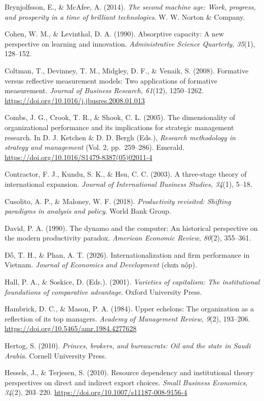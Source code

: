 \documentclass[
  a4paper,
  13pt]{extreport}
\begin{document}
Brynjolfsson, E., \& McAfee, A. (2014). \emph{The second machine age:
Work, progress, and prosperity in a time of brilliant technologies}. W.
W. Norton \& Company.

Cohen, W. M., \& Levinthal, D. A. (1990). Absorptive capacity: A new
perspective on learning and innovation. \emph{Administrative Science
Quarterly, 35}(1), 128--152.

Coltman, T., Devinney, T. M., Midgley, D. F., \& Venaik, S. (2008).
Formative versus reflective measurement models: Two applications of
formative measurement. \emph{Journal of Business Research, 61}(12),
1250--1262. \url{https://doi.org/10.1016/j.jbusres.2008.01.013}

Combs, J. G., Crook, T. R., \& Shook, C. L. (2005). The dimensionality
of organizational performance and its implications for strategic
management research. In D. J. Ketchen \& D. D. Bergh (Eds.),
\emph{Research methodology in strategy and management} (Vol. 2,
pp.~259--286). Emerald.
\url{https://doi.org/10.1016/S1479-8387(05)02011-4}

Contractor, F. J., Kundu, S. K., \& Hsu, C. C. (2003). A three-stage
theory of international expansion. \emph{Journal of International
Business Studies, 34}(1), 5--18.

Cusolito, A. P., \& Maloney, W. F. (2018). \emph{Productivity revisited:
Shifting paradigms in analysis and policy}. World Bank Group.

David, P. A. (1990). The dynamo and the computer: An historical
perspective on the modern productivity paradox. \emph{American Economic
Review, 80}(2), 355--361.

Đỗ, T. H., \& Phan, A. T. (2026). Internationalization and firm
performance in Vietnam. \emph{Journal of Economics and Development}
(chưa nộp).

Hall, P. A., \& Soskice, D. (Eds.). (2001). \emph{Varieties of
capitalism: The institutional foundations of comparative advantage}.
Oxford University Press.

Hambrick, D. C., \& Mason, P. A. (1984). Upper echelons: The
organization as a reflection of its top managers. \emph{Academy of
Management Review, 9}(2), 193--206.
\url{https://doi.org/10.5465/amr.1984.4277628}

Hertog, S. (2010). \emph{Princes, brokers, and bureaucrats: Oil and the
state in Saudi Arabia}. Cornell University Press.

Hessels, J., \& Terjesen, S. (2010). Resource dependency and
institutional theory perspectives on direct and indirect export choices.
\emph{Small Business Economics, 34}(2), 203--220.
\url{https://doi.org/10.1007/s11187-008-9156-4}
\end{document}
